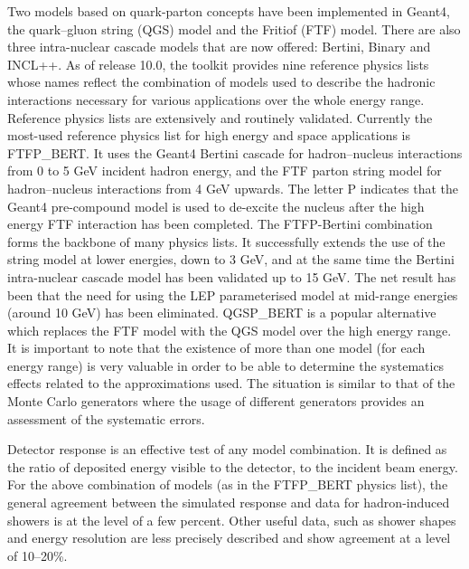 \documentclass[12pt,a4paper]{article}
\begin{document}
Two models based on quark-parton concepts have been implemented in
Geant4, the quark--gluon string (QGS) model and the Fritiof (FTF) model.
There are also three intra-nuclear cascade models that are now offered:
Bertini, Binary and INCL++. As of release 10.0, the toolkit provides
nine reference physics lists whose names reflect the combination of
models used to describe the hadronic interactions necessary for various
applications over the whole energy range. Reference physics lists are
extensively and routinely validated. Currently the most-used reference
physics list for high energy and space applications is FTFP\_BERT. It
uses the Geant4 Bertini cascade for hadron--nucleus interactions from 0
to 5 GeV incident hadron energy, and the FTF parton string model for
hadron--nucleus interactions from 4 GeV upwards. The letter P indicates
that the Geant4 pre-compound model is used to de-excite the nucleus
after the high energy FTF interaction has been completed. The
FTFP-Bertini combination forms the backbone of many physics lists. It
successfully extends the use of the string model at lower energies, down
to 3 GeV, and at the same time the Bertini intra-nuclear cascade model
has been validated up to 15 GeV. The net result has been that the need
for using the LEP parameterised model at mid-range energies (around 10
GeV) has been eliminated. QGSP\_BERT is a popular alternative which
replaces the FTF model with the QGS model over the high energy range. It
is important to note that the existence of more than one model (for each
energy range) is very valuable in order to be able to determine the
systematics effects related to the approximations used. The situation is
similar to that of the Monte Carlo generators where the usage of
different generators provides an assessment of the systematic errors.

Detector response is an effective test of any model combination. It is
defined as the ratio of deposited energy visible to the detector, to the
incident beam energy. For the above combination of models (as in the
FTFP\_BERT physics list), the general agreement between the simulated
response and data for hadron-induced showers is at the level of a few
percent. Other useful data, such as shower shapes and energy resolution
are less precisely described and show agreement at a level of 10--20\%.
\end{document}
